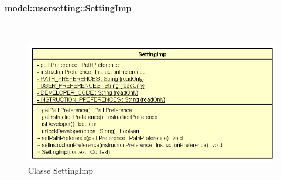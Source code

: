 \documentclass[../DefinizioneDiProdotto.tex]{subfiles}
\begin{document}
\paragraph{model::usersetting::SettingImp}
\
\begin{figure}[H]
	\centering
	\includegraphics[width=\maxwidth]{img/SettingImp.png}
	\caption{Classe SettingImp}\label{fig:model::usersetting::SettingImp} 
\end{figure}
\end{document}
